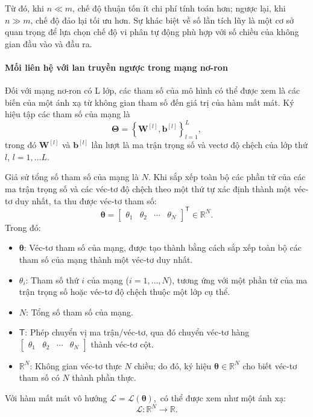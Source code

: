 Từ đó, khi $n \ll m$, chế độ thuận tốn ít chi phí tính toán hơn; ngược lại, khi $n \gg m$, chế độ đảo lại tối ưu hơn. Sự khác biệt về số lần tích lũy là một cơ sở quan trọng để lựa chọn chế độ vi phân tự động phù hợp với số chiều của không gian đầu vào và đầu ra.


\paragraph{Mối liên hệ với lan truyền ngược trong mạng nơ-ron\\}
Đối với mạng nơ-ron có L lớp, các tham số của mô hình có thể được xem là các biến của một ánh xạ từ không gian tham số đến giá trị của hàm mất mát. Ký hiệu tập các tham số của mạng là
\begin{equation}
\boldsymbol{\Theta}
=
\left\{
\mathbf{W}^{[l]},\mathbf{b}^{[l]}
\right\}_{l=1}^{L},
\end{equation}
trong đó $\mathbf{W}^{[l]}$ và $\mathbf{b}^{[l]}$ lần lượt là ma trận trọng số và vectơ độ chệch của lớp thứ $l$, $l=1,...L$. 

Giả sử tổng số tham số của mạng là $N$. Khi sắp xếp toàn bộ các phần tử của các ma trận trọng số và các véc-tơ độ chệch theo một thứ tự xác định thành một véc-tơ duy nhất, ta thu được véc-tơ tham số:
\begin{equation}
\boldsymbol{\theta} =
\begin{bmatrix}
\theta_1 & \theta_2 & \cdots & \theta_N
\end{bmatrix}^{\mathsf T}
\in\mathbb{R}^{N}.
\end{equation}
Trong đó:
\begin{itemize}
    \item $\boldsymbol{\theta}$: Véc-tơ tham số của mạng, được tạo thành bằng cách sắp xếp toàn bộ các tham số của mạng thành một véc-tơ duy nhất.
    \item $\theta_i$: Tham số thứ $i$ của mạng ($i=1,\ldots,N$), tương ứng với một phần tử của ma trận trọng số hoặc véc-tơ độ chệch thuộc một lớp cụ thể.
    \item $N$: Tổng số tham số của mạng.
    \item $\mathsf{T}$: Phép chuyển vị ma trận/véc-tơ, qua đó chuyển véc-tơ hàng $\begin{bmatrix} \theta_1 & \theta_2 & \cdots & \theta_N \end{bmatrix}$ thành véc-tơ cột.
    \item $\mathbb{R}^{N}$: Không gian véc-tơ thực $N$ chiều; do đó, ký hiệu $\boldsymbol{\theta}\in\mathbb{R}^{N}$ cho biết véc-tơ tham số có $N$ thành phần thực.
\end{itemize}
Với hàm mất mát vô hướng $\mathcal{L}=\mathcal{L}(\boldsymbol{\theta}),$ có thể được xem như một ánh xạ:
\begin{equation}
\mathcal{L}:\mathbb{R}^{N}\rightarrow\mathbb{R}.
\end{equation}

